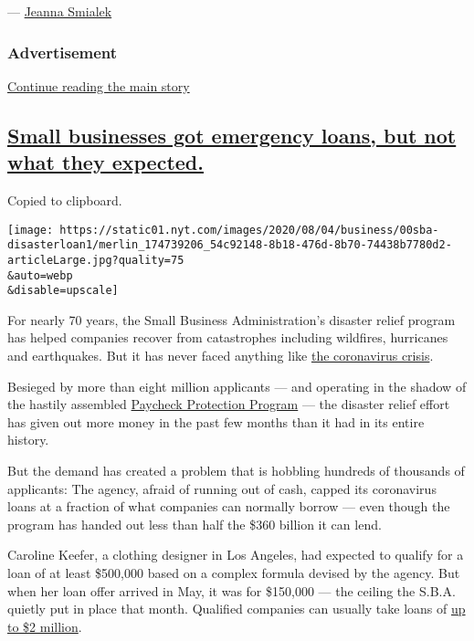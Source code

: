 --- \href{https://www.nytimes.com/by/jeanna-smialek}{Jeanna Smialek}

\hypertarget{advertisement}{%
\subsubsection{Advertisement}\label{advertisement}}

\protect\hyperlink{after-dfp-ad-mid1}{Continue reading the main story}

\hypertarget{small-businesses-got-emergency-loans-but-not-what-they-expected}{%
\subsection{\texorpdfstring{\protect\hyperlink{small-businesses-got-emergency-loans-but-not-what-they-expected}{Small
businesses got emergency loans, but not what they
expected.}}{Small businesses got emergency loans, but not what they expected.}}\label{small-businesses-got-emergency-loans-but-not-what-they-expected}}

Copied to clipboard.

\texttt{[image: https://static01.nyt.com/images/2020/08/04/business/00sba-disasterloan1/merlin\_174739206\_54c92148-8b18-476d-8b70-74438b7780d2-articleLarge.jpg?quality=75\\\&auto=webp\\\&disable=upscale]}

For nearly 70 years, the Small Business Administration's disaster relief
program has helped companies recover from catastrophes including
wildfires, hurricanes and earthquakes. But it has never faced anything
like \href{https://www.nytimes.com/news-event/coronavirus}{the
coronavirus crisis}.

Besieged by more than eight million applicants --- and operating in the
shadow of the hastily assembled
\href{https://www.nytimes.com/2020/04/26/business/ppp-small-business-loans.html}{Paycheck
Protection Program} --- the disaster relief effort has given out more
money in the past few months than it had in its entire history.

But the demand has created a problem that is hobbling hundreds of
thousands of applicants: The agency, afraid of running out of cash,
capped its coronavirus loans at a fraction of what companies can
normally borrow --- even though the program has handed out less than
half the \$360 billion it can lend.

Caroline Keefer, a clothing designer in Los Angeles, had expected to
qualify for a loan of at least \$500,000 based on a complex formula
devised by the agency. But when her loan offer arrived in May, it was
for \$150,000 --- the ceiling the S.B.A. quietly put in place that
month. Qualified companies can usually take loans of
\href{https://www.sba.gov/about-sba/sba-newsroom/press-releases-media-advisories/sba-provide-disaster-assistance-loans-small-businesses-impacted-coronavirus-covid-19}{up
to \$2 million}.

